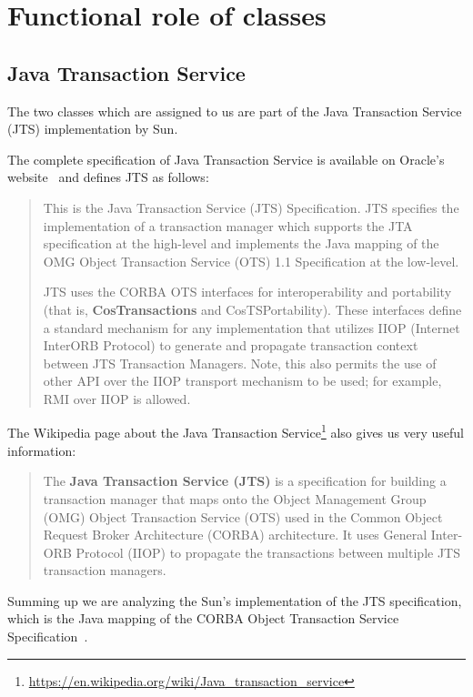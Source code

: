 \section{Functional role of classes}
\label{sec:functional-role}

\subsection{Java Transaction Service}
The two classes which are assigned to us are part of the Java Transaction Service (JTS) implementation by Sun.

The complete specification of Java Transaction Service is available on Oracle's website~\cite{jts-specification} and defines JTS as follows:
\begin{quotation}
This is the Java Transaction Service (JTS) Specification.
JTS specifies the
implementation of a transaction manager which supports the JTA specification at
the high-level and implements the Java mapping of the OMG Object Transaction
Service (OTS) 1.1 Specification at the low-level.

JTS uses the CORBA OTS interfaces for interoperability and portability (that is, \textbf{CosTransactions} and CosTSPortability).
These interfaces define a standard mechanism for any implementation that utilizes IIOP (Internet InterORB Protocol) to generate and
propagate transaction context between JTS Transaction Managers. Note, this also
permits the use of other API over the IIOP transport mechanism to be used; for
example, RMI over IIOP is allowed.
\end{quotation}

The Wikipedia page about the Java Transaction Service\footnote{\url{https://en.wikipedia.org/wiki/Java_transaction_service}} also gives us very useful information:
\begin{quote}
The \textbf{Java Transaction Service (JTS)} is a specification for building a transaction manager that maps onto the Object Management Group (OMG) Object Transaction Service (OTS) used in the Common Object Request Broker Architecture (CORBA) architecture. It uses General Inter-ORB Protocol (IIOP) to propagate the transactions between multiple JTS transaction managers.
\end{quote}

Summing up we are analyzing the Sun's implementation of the JTS specification, which is the Java mapping of the CORBA Object Transaction Service Specification~\cite{omg-ots}.

